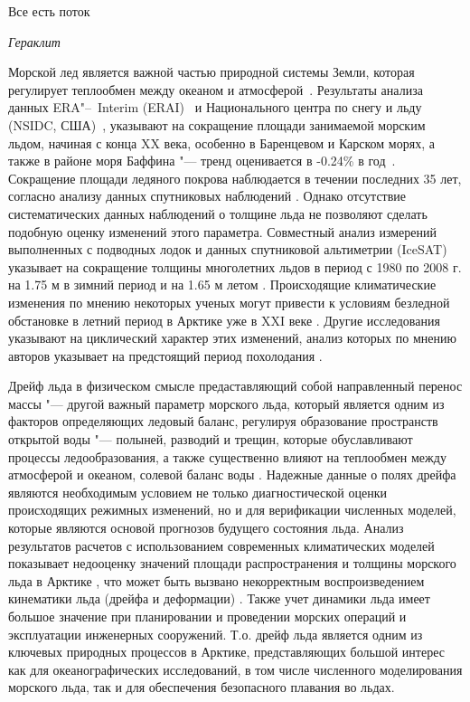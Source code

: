
{\actuality} \epigraph{Все есть поток}{\textit{Гераклит}}
Морской лед является важной частью природной системы Земли, которая регулирует теплообмен между океаном и атмосферой~\cite{vaughan2013observations}. Результаты анализа данных ERA"--~Interim (ERAI)~\cite{dee2011era} и Национального центра по снегу и льду (NSIDC, США)~\cite{cavalieri1996updated}, указывают на сокращение площади занимаемой морским льдом, начиная с конца XX века, особенно в Баренцевом и Карском морях, а также в районе моря Баффина "--- тренд оценивается в -0.24\% в год~\cite{park2015attribution}. Сокращение площади ледяного покрова наблюдается в течении последних 35 лет, согласно анализу данных спутниковых наблюдений \cite{simmonds2015comparing}. Однако отсутствие систематических данных наблюдений о толщине льда не позволяют сделать подобную оценку изменений этого параметра. Совместный анализ измерений выполненных с подводных лодок и данных спутниковой альтиметрии (IceSAT) указывает на сокращение толщины многолетних льдов в период с 1980 по 2008 г. на 1.75 м в зимний период и на 1.65 м летом \cite{rothrock2008decline,kwok2009thinning}. Происходящие климатические изменения по мнению некоторых ученых могут привести к условиям безледной обстановке в летний период в Арктике уже в XXI веке  \cite{stroeve2007arctic,wang2009sea,massonnet2012constraining,Laliber_2016,Jahn_2016}. Другие исследования указывают на циклический характер этих изменений, анализ которых по мнению авторов указывает на предстоящий период похолодания \cite{Frolov2010,Frolov2007_1,Frolov2007_2}.

Дрейф льда в физическом смысле предаставляющий собой направленный перенос массы "--- другой важный параметр морского льда, который является одним из факторов определяющих ледовый баланс, регулируя образование пространств открытой воды "--- полыней, разводий и трещин, которые обуславливают процессы ледообразования, а также существенно влияют на теплообмен между атмосферой и океаном, солевой баланс воды \cite{jordan1999heat,Makshtas1977}. Надежные данные о полях дрейфа являются необходимым условием не только диагностической оценки происходящих режимных изменений, но и для верификации численных моделей, которые являются основой прогнозов будущего состояния льда. Анализ результатов расчетов с использованием современных климатических  моделей показывает недооценку значений площади распространения и толщины морского льда в Арктике \cite{stroeve2007arctic}, что может быть вызвано некорректным воспроизведением кинематики льда (дрейфа и деформации)  \cite{rampal2011ipcc}. Также учет динамики льда имеет большое значение при планировании и проведении морских операций и эксплуатации инженерных сооружений. Т.о. дрейф льда является одним из ключевых природных процессов в Арктике, представляющих большой интерес как для океанографических исследований, в том числе численного моделирования морского льда, так и для обеспечения безопасного плавания во льдах.

